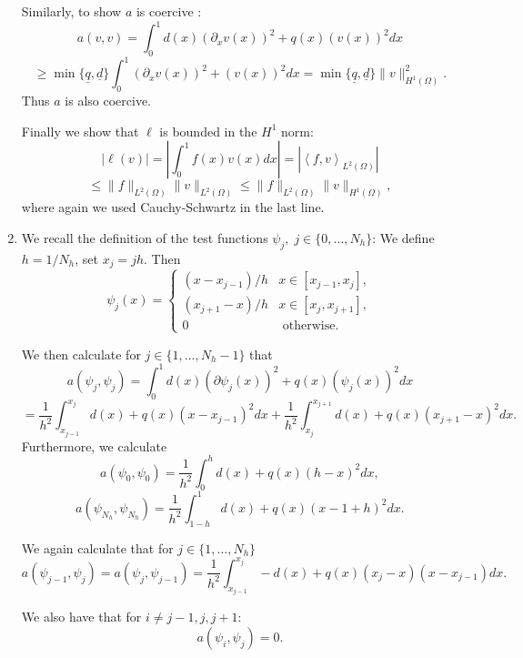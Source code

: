 \documentclass[a4paper,11pt]{article}
\theoremstyle{plain} %
\theoremstyle{definition} %
\theoremstyle{remark} %
\newcommand{\abs}[1]{\left | #1  \right | }
\newcommand{\qu}{\underline q}
\newcommand{\du}{\underline d}
\newcommand{\ip}[2]{\left \langle #1 , #2 \right \rangle}
\begin{document}
\begin{enumerate}
Similarly, to show $a$ is coercive :
\[a(v,v) = \int^1_0 d(x)(\partial_x v(x))^2+ q(x)(v(x))^2dx \] 
\[\geq  \min \{\qu, \du \} \int^1_0(\partial_x v(x))^2+(v(x))^2dx  = \min \{\qu, \du \}\|v\|_{H^1(\Omega)}^2.\] 
Thus $a$ is also coercive.

Finally we show that $\ell$ is bounded in the $H^1$ norm:
\[\abs{\ell(v)} = \abs{\int_0^1 f(x) v(x) dx} = \abs{\ip{f}{v}_{L^2(\Omega)}} \] 
\[\leq  \|f\|_{L^2(\Omega)}\|v\|_{L^2(\Omega)} \leq \|f\|_{L^2(\Omega)}\|v\|_{H^1(\Omega)},\]
where again we used Cauchy-Schwartz in the last line.
\item We recall the definition of the test functions $\psi_j, \; j \in \{0,\dotsc, N_h\}$: We define $h = 1/N_h$, set $x_j = jh$. Then 
\[\psi_j(x) = 
\begin{cases} 
(x-x_{j-1})/h & x\in [x_{j-1}, x_j], \\
(x_{j+1}-x)/h & x \in [x_j, x_{j+1}], \\
0 & \text{ otherwise.} 
\end{cases} \] 

We then calculate for $j \in \{1,\dotsc, N_h-1 \}$ that
\[a(\psi_j,\psi_j) = \int_0^1d(x)(\partial \psi_j(x))^2 + q(x)(\psi_j(x))^2dx \] 
\[= \frac{1}{h^2} \int_{x_{j-1}}^{x_j} d(x) + q(x)(x-x_{j-1})^2dx + \frac{1}{h^2}\int_{x_{j}}^{x_{j+1}} d(x) + q(x)(x_{j+1}-x)^2dx.\]
Furthermore, we calculate
\[a(\psi_0,\psi_0) =  \frac{1}{h^2}\int_{0}^{h} d(x) + q(x)(h-x)^2dx, \]
\[a(\psi_{N_h},\psi_{N_h}) =\frac{1}{h^2} \int_{1-h}^1 d(x) + q(x)(x-1+h)^2dx . \]

We again calculate that for  $j \in \{1,\dotsc, N_h \}$
\[a(\psi_{j-1}, \psi_j) = a(\psi_j,\psi_{j-1}) = \frac{1}{h^2}\int_{x_{j-1}}^{x_j} -d(x) + q(x)(x_j-x)(x-x_{j-1})dx. \]

We also have that for $ i \neq j-1, j , j+1$:
\[ a(\psi_i,\psi_j) = 0. \]


\end{enumerate}
\end{document}
